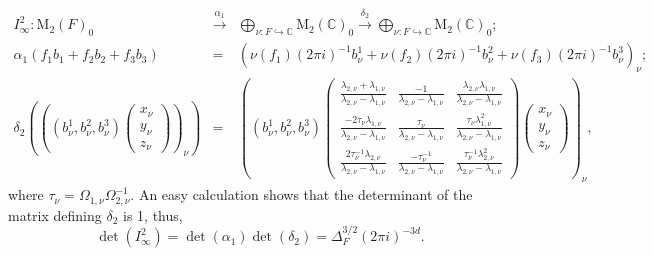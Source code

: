 \documentclass{amsart}
\theoremstyle{definition}
\theoremstyle{remark}
\numberwithin{equation}{section}
\newcommand{\M}{\mathrm{M}}
\newcommand{\C}{{\mathbb C}}
\begin{document}
\begin{eqnarray*}
I_\infty^2:\M_2(F)_0&\stackrel{\alpha_1}{\longrightarrow}&\bigoplus_{\nu:F\hookrightarrow\C}\M_2(\C)_0\stackrel{\delta_2}{\longrightarrow}\bigoplus_{\nu:F\hookrightarrow\C}\M_2(\C)_0;\\ \alpha_1(f_1b_1+f_2b_2+f_3b_3)&=&\left(\nu(f_1)({2\pi i})^{-1}b_\nu^1+\nu(f_2)({2\pi i})^{-1}b_\nu^2+\nu(f_3)({2\pi i})^{-1}b_\nu^3\right)_\nu;\\
\delta_2\left(\left((b_\nu^1, b_\nu^2, b_\nu^3)\left(\begin{smallmatrix}x_\nu\\y_\nu\\z_\nu\end{smallmatrix}\right)\right)_\nu\right)&=&%
\left((b_\nu^1, b_\nu^2, b_\nu^3)\left(\begin{smallmatrix}\frac{\lambda_{2,\nu}+\lambda_{1,\nu}}{\lambda_{2,\nu}-\lambda_{1,\nu}}&\frac{-1}{\lambda_{2,\nu}-\lambda_{1,\nu}}&\frac{\lambda_{2,\nu}\lambda_{1,\nu}}{\lambda_{2,\nu}-\lambda_{1,\nu}}\\\frac{-2\tau_\nu\lambda_{1,\nu}}{\lambda_{2,\nu}-\lambda_{1,\nu}}&\frac{\tau_\nu}{\lambda_{2,\nu}-\lambda_{1,\nu}}&\frac{\tau_\nu\lambda_{1,\nu}^2}{\lambda_{2,\nu}-\lambda_{1,\nu}}\\\frac{2\tau_\nu^{-1}\lambda_{2,\nu}}{\lambda_{2,\nu}-\lambda_{1,\nu}}&\frac{-\tau_\nu^{-1}}{\lambda_{2,\nu}-\lambda_{1,\nu}}&\frac{\tau_\nu^{-1}\lambda_{2,\nu}^2}{\lambda_{2,\nu}-\lambda_{1,\nu}}\end{smallmatrix}\right)\left(\begin{smallmatrix}x_\nu\\y_\nu\\z_\nu\end{smallmatrix}\right)\right)_\nu,\qquad\qquad\qquad\qquad\quad%
\end{eqnarray*}
       where $\tau_\nu=\Omega_{1,\nu}\Omega_{2,\nu}^{-1}$. An easy calculation shows that the determinant of the matrix defining $\delta_2$ is 1, thus,
\[
\det(I^2_\infty)=\det(\alpha_1)\det(\delta_2)=\Delta_F^{3/2}(2\pi i)^{-3d}.
\]
\end{document}
